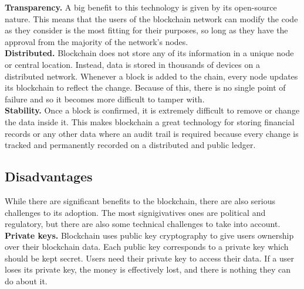 \textbf{Transparency.}
A big benefit to this technology is given by its open-source nature. This means
that the users of the blockchain network can modify the code as they consider is the most fitting for their purposes, so long
as they have the approval from the majority of the network's nodes.\bigskip\\

\textbf{Distributed.}
Blockchain does not store any of its information in a unique node or central 
location. Instead, data is stored in thousands of devices on a distributed
network. Whenever a block is added to the chain, every node updates its blockchain
to reflect the change. Because of this, there is no single point of failure
and so it becomes more difficult to tamper with.\cite{binancevision}\cite{investopedia}\bigskip\\

\textbf{Stability.}
Once a block is confirmed, it is extremely difficult to remove or change the data inside it.
This makes blockchain a great technology for storing financial records or any other data 
where an audit trail is required because every change is tracked and permanently recorded 
on a distributed and public ledger.\cite{binancevision}
\bigskip

\subsection{Disadvantages}
\label{sec:disadvantages}

While there are significant benefits to the blockchain, there are also serious
challenges to its adoption. The most signigivatives ones are political and regulatory\cite{investopedia}, but 
there are also some technical challenges to take into account.\bigskip\\

\textbf{Private keys.} 
Blockchain uses public key cryptography to give users ownership over their blockchain data.
Each public key corresponds to a private key which should be kept secret. Users need their 
private key to access their data. If a user loses its private key, the money is 
effectively lost, and there is nothing they can do about it.\cite{binancevision}\\

